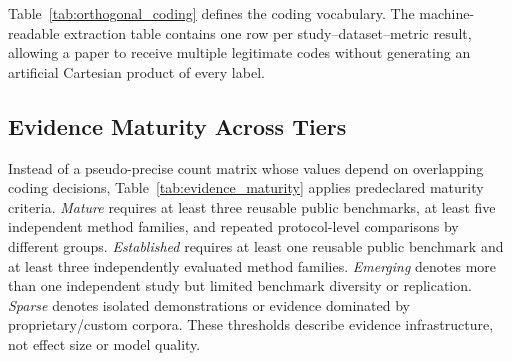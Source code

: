 \documentclass[10pt,a4paper]{article}
\renewcommand{\arraystretch}{1.12}
\begin{document}
Table~\ref{tab:orthogonal_coding} defines the coding vocabulary. The machine-readable extraction table contains one row per study--dataset--metric result, allowing a paper to receive multiple legitimate codes without generating an artificial Cartesian product of every label.

\begin{table}[!t]
\centering
\caption{Separable method dimensions used to describe the reviewed evidence. A paper may receive multiple codes within and across dimensions.}
\label{tab:orthogonal_coding}
\renewcommand{\arraystretch}{1.3}
\end{table}

\subsection{Evidence Maturity Across Tiers}
\label{subsec:evidence_maturity}
Instead of a pseudo-precise count matrix whose values depend on overlapping coding decisions, Table~\ref{tab:evidence_maturity} applies predeclared maturity criteria. \emph{Mature} requires at least three reusable public benchmarks, at least five independent method families, and repeated protocol-level comparisons by different groups. \emph{Established} requires at least one reusable public benchmark and at least three independently evaluated method families. \emph{Emerging} denotes more than one independent study but limited benchmark diversity or replication. \emph{Sparse} denotes isolated demonstrations or evidence dominated by proprietary/custom corpora. These thresholds describe evidence infrastructure, not effect size or model quality.
\end{document}
